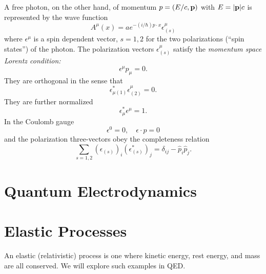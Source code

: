 A free photon, on the other hand, of momentum $p = (E/c, \bold{p})$ with
$E = |\bold{p}|c$ is represented by the wave function
\begin{equation}
A^{\mu}(x) = ae^{-(i/\hbar)p\cdot x}\epsilon^\mu_{(s)}
\end{equation}
where $\epsilon^\mu$ is a spin dependent vector, $s=1,2$ for the two polarizations
(``spin states'') of the photon. The polarization vectors $\epsilon^\mu_{(s)}$
satisfy the \emph{momentum space Lorentz condition:}
\begin{equation}
\epsilon^\mu p_\mu = 0.
\end{equation}
 They are orthogonal in the sense that 
\begin{equation}
\epsilon_{\mu(1)}^{*}\epsilon^{\mu}_{(2)} = 0.
\end{equation}
They are further normalized
\begin{equation}
\epsilon^{*}_{\mu}\epsilon^{\mu} = 1.
\end{equation}
In the Coulomb gauge
\begin{equation}
\epsilon^0=0,\quad \epsilon\cdot p = 0
\end{equation}
and the polarization three-vectors obey the completeness relation
\begin{equation}
\sum_{s=1,2} (\epsilon_{(s)})_i (\epsilon^{*}_{(s)})_j = \delta_{ij} - \hat{p}_{i}\hat{p}_{j}.
\end{equation}

\section{Quantum Electrodynamics}

\section{Elastic Processes}

An elastic (relativistic) process is one where kinetic energy, rest energy, and
mass are all conserved. We will explore such examples in QED.




%

% 
%
